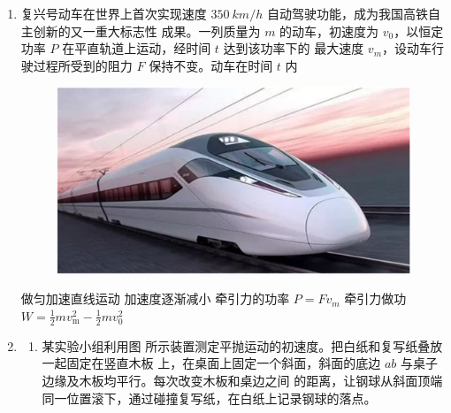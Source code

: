 \begin{enumerate}



\item
复兴号动车在世界上首次实现速度 $ 350 \ km/h $ 自动驾驶功能，成为我国高铁自主创新的又一重大标志性
成果。一列质量为 $ m $ 的动车，初速度为 $ v_{0} $，以恒定功率 $ P $ 在平直轨道上运动，经时间 $ t $ 达到该功率下的
最大速度 $ v_{m} $，设动车行驶过程所受到的阻力 $ F $ 保持不变。动车在时间 $ t $ 内  
\begin{figure}[h!]
\centering
\includegraphics[width=0.3\linewidth]{picture/screenshot055}
\end{figure}


\fourchoices
{做匀加速直线运动}
{加速度逐渐减小}
{牵引力的功率 $ P=Fv_{m} $}
{牵引力做功 $W=\frac{1}{2} m v_{\mathrm{m}}^{2}-\frac{1}{2} m v_{0}^{2}$}






\gaokaosy

\item
\begin{enumerate}
\item
某实验小组利用图  所示装置测定平抛运动的初速度。把白纸和复写纸叠放一起固定在竖直木板
上，在桌面上固定一个斜面，斜面的底边 $ ab $ 与桌子边缘及木板均平行。每次改变木板和桌边之间
的距离，让钢球从斜面顶端同一位置滚下，通过碰撞复写纸，在白纸上记录钢球的落点。
\begin{figure}[h!]
\centering
\begin{subfigure}{0.4\linewidth}
\centering
 
\caption{}\label{2020天津09a}
\end{subfigure}
\begin{subfigure}{0.4\linewidth}
\centering
 
\caption{}\label{2020天津09b}
\end{subfigure}
\end{figure}


\end{enumerate}
\end{enumerate}
